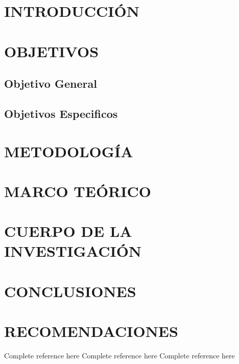 \section*{INTRODUCCIÓN}

\lipsum[1-3]

\section{OBJETIVOS}

    \subsection{Objetivo General}
    \lipsum[1-2]

    \subsection{Objetivos Especificos}
    \lipsum[3-4]

\section{METODOLOGÍA}
\lipsum[7-9]

\section{MARCO TEÓRICO}
\lipsum[10-12]

\section{CUERPO DE LA INVESTIGACIÓN}
\lipsum[13-15]

\section{CONCLUSIONES}

\section{RECOMENDACIONES}



\clearpage
\begin{thebibliography}{X}
     Complete reference here
     Complete reference here
     Complete reference here
\end{thebibliography}